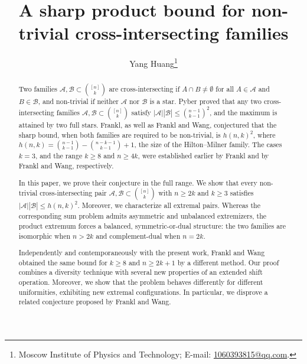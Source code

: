 \documentclass[a4paper,11pt]{article}
\newcommand{\m}{\mathcal}
\begin{document}

\title{A sharp product bound for non-trivial cross-intersecting families}

% 


\author{
Yang Huang\thanks{Moscow Institute of Physics and Technology; 
E-mail: \url{1060393815@qq.com}.}
}
\date{}
\maketitle
\vspace{-0.5cm}
\begin{abstract}
Two families $\mathcal{A}, \mathcal{B} \subset \binom{[n]}{k}$ are cross-intersecting if $A \cap B \ne \emptyset$ for all
$A \in \mathcal{A}$ and $B \in \mathcal{B}$, and non-trivial
if neither $\m A$ nor $\m B$ is a star. Pyber proved that any two cross-intersecting families 
$\mathcal{A}, \mathcal{B} \subset \binom{[n]}{k}$ satisfy
$|\mathcal{A}||\mathcal{B}| \le \binom{n-1}{k-1}^2$, and the maximum is 
attained by two full stars. 
Frankl, as well as Frankl and Wang, conjectured that the sharp bound, when both families are required to be non-trivial, is $h(n,k)^2$, where $h(n,k) = \binom{n-1}{k-1} - \binom{n-k-1}{k-1} + 1$, the size of
the Hilton--Milner family. The cases $k=3$, and the range $k\ge8$ and $n\ge 4k$, were established earlier
by Frankl and by Frankl and Wang, respectively.

In this paper, we prove their conjecture in the full range. We show that every non-trivial cross-intersecting pair $\mathcal{A}, \mathcal{B} \subset \binom{[n]}{k}$ with $n \ge 2k$ and $k \ge 3$ satisfies $|\mathcal{A}||\mathcal{B}| \le h(n,k)^2$. Moreover, we characterize all extremal pairs. Whereas the corresponding sum problem admits asymmetric and
unbalanced extremizers, the product extremum forces a balanced,
symmetric-or-dual structure: the two families are isomorphic  when
$n>2k$ and complement-dual when $n=2k$.

Independently and contemporaneously with the present work, Frankl and
Wang obtained the same bound for $k\ge8$ and $n\ge2k+1$ by a different
method. Our proof combines a diversity technique with several new properties
of an extended shift operation.
Moreover, we show that the problem behaves differently for different uniformities, exhibiting new extremal configurations. In particular, we disprove a related conjecture proposed by Frankl and Wang. 
\end{abstract}
\end{document}
